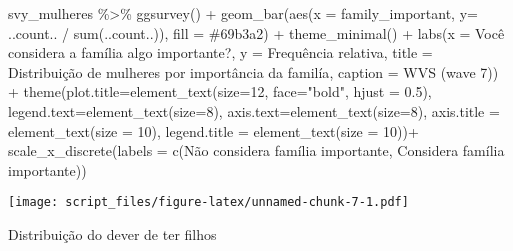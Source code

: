 \documentclass[
]{article}
\newenvironment{Shaded}{\begin{snugshade}}{\end{snugshade}}
\newcommand{\AttributeTok}[1]{\textcolor[rgb]{0.77,0.63,0.00}{#1}}
\newcommand{\DecValTok}[1]{\textcolor[rgb]{0.00,0.00,0.81}{#1}}
\newcommand{\FloatTok}[1]{\textcolor[rgb]{0.00,0.00,0.81}{#1}}
\newcommand{\FunctionTok}[1]{\textcolor[rgb]{0.00,0.00,0.00}{#1}}
\newcommand{\NormalTok}[1]{#1}
\newcommand{\SpecialCharTok}[1]{\textcolor[rgb]{0.00,0.00,0.00}{#1}}
\newcommand{\StringTok}[1]{\textcolor[rgb]{0.31,0.60,0.02}{#1}}
\begin{document}
\begin{Shaded}
\begin{Highlighting}[]
\NormalTok{svy\_mulheres }\SpecialCharTok{\%\textgreater{}\%}
  \FunctionTok{ggsurvey}\NormalTok{() }\SpecialCharTok{+}
  \FunctionTok{geom\_bar}\NormalTok{(}\FunctionTok{aes}\NormalTok{(}\AttributeTok{x =}\NormalTok{ family\_important, }\AttributeTok{y=}\NormalTok{ ..count.. }\SpecialCharTok{/} \FunctionTok{sum}\NormalTok{(..count..)), }\AttributeTok{fill =} \StringTok{\textquotesingle{}\#69b3a2\textquotesingle{}}\NormalTok{) }\SpecialCharTok{+}
  \FunctionTok{theme\_minimal}\NormalTok{() }\SpecialCharTok{+}
  \FunctionTok{labs}\NormalTok{(}\AttributeTok{x =} \StringTok{\textquotesingle{}Você considera a família algo importante?\textquotesingle{}}\NormalTok{,}
       \AttributeTok{y =} \StringTok{\textquotesingle{}Frequência relativa\textquotesingle{}}\NormalTok{,}
       \AttributeTok{title =} \StringTok{\textquotesingle{}Distribuição de mulheres por importância da familía\textquotesingle{}}\NormalTok{,}
       \AttributeTok{caption =} \StringTok{\textquotesingle{}WVS (wave 7)\textquotesingle{}}\NormalTok{) }\SpecialCharTok{+}
  \FunctionTok{theme}\NormalTok{(}\AttributeTok{plot.title=}\FunctionTok{element\_text}\NormalTok{(}\AttributeTok{size=}\DecValTok{12}\NormalTok{, }\AttributeTok{face=}\StringTok{"bold"}\NormalTok{, }\AttributeTok{hjust =} \FloatTok{0.5}\NormalTok{),}
        \AttributeTok{legend.text=}\FunctionTok{element\_text}\NormalTok{(}\AttributeTok{size=}\DecValTok{8}\NormalTok{),}
        \AttributeTok{axis.text=}\FunctionTok{element\_text}\NormalTok{(}\AttributeTok{size=}\DecValTok{8}\NormalTok{),}
        \AttributeTok{axis.title =} \FunctionTok{element\_text}\NormalTok{(}\AttributeTok{size =} \DecValTok{10}\NormalTok{),}
        \AttributeTok{legend.title =} \FunctionTok{element\_text}\NormalTok{(}\AttributeTok{size =} \DecValTok{10}\NormalTok{))}\SpecialCharTok{+}
  \FunctionTok{scale\_x\_discrete}\NormalTok{(}\AttributeTok{labels =} \FunctionTok{c}\NormalTok{(}\StringTok{\textquotesingle{}Não considera família importante\textquotesingle{}}\NormalTok{, }\StringTok{\textquotesingle{}Considera família importante\textquotesingle{}}\NormalTok{))}
\end{Highlighting}
\end{Shaded}

\texttt{[image: script\_files/figure-latex/unnamed-chunk-7-1.pdf]}

Distribuição do dever de ter filhos
\end{document}
